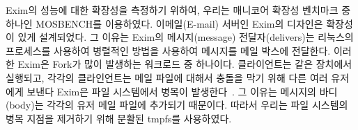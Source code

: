 Exim의 성능에 대한 확장성을 측정하기 위하여, 우리는 매니코어 확장성 벤치마크 중 하나인
 MOSBENCH를 이용하였다. 
이메일(E-mail) 서버인 Exim의 디자인은 확장성이 있게 설계되었다. 그 이유는 Exim의 메시지(message)
전달자(delivers)는 리눅스의 프로세스를 사용하여 병렬적인 방법을 사용하여 메시지를 메일 박스에 전달한다. 
이러한 Exim은 Fork가 많이 발생하는 워크로드 중 하나이다. 
클라이언트는 같은 장치에서 실행되고, 각각의 클라인언트는 메일 파일에 대해서 충돌을 막기 위해
 다른 여러 유저에게 보낸다 
Exim은 파일 시스템에서 병목이 발생한다~\cite{SilasBoydWickizer2010LinuxScales48}.
그 이유는 메시지의 바디(body)는 각각의 유저 메일 파일에 추가되기 때문이다.
따라서 우리는 파일 시스템의 병목 지점을 제거하기 위해 분활된 tmpfs를 사용하였다. 

